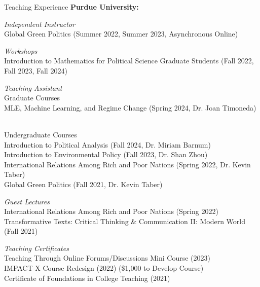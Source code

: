 \documentclass{resume} %
\begin{document}
\begin{rSection}{Teaching Experience} %
\textbf{Purdue University:}

{\it Independent Instructor}
\\Global Green Politics (Summer 2022, Summer 2023, Asynchronous Online)

{\it Workshops}
\\Introduction to Mathematics for Political Science Graduate Students (Fall 2022, Fall 2023, Fall 2024)

{\it Teaching Assistant}
\\Graduate Courses
\\MLE, Machine Learning, and Regime Change (Spring 2024, Dr. Joan Timoneda)

\\Undergraduate Courses
\\Introduction to Political Analysis (Fall 2024, Dr. Miriam Barnum)
\\Introduction to Environmental Policy (Fall 2023, Dr. Shan Zhou)
\\International Relations Among Rich and Poor Nations (Spring 2022, Dr. Kevin Taber)
\\Global Green Politics (Fall 2021, Dr. Kevin Taber)

{\it Guest Lectures}
\\International Relations Among Rich and Poor Nations (Spring 2022)
\\Transformative Texts: Critical Thinking \& Communication II: Modern World (Fall 2021)

{\it Teaching Certificates} 
\\Teaching Through Online Forums/Discussions Mini Course (2023)
\\IMPACT-X Course Redesign (2022) (\$1,000 to Develop Course)
\\Certificate of Foundations in College Teaching (2021)

\end{rSection}


\end{document}
